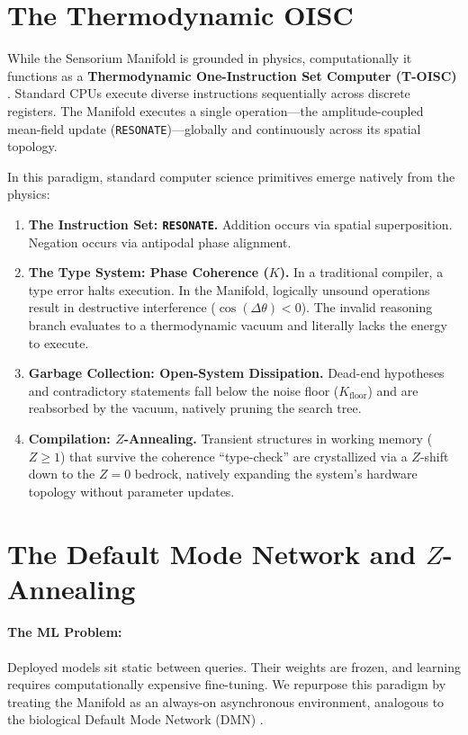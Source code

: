 \documentclass[11pt,a4paper]{article}
\begin{document}
\section{The Thermodynamic OISC}
\label{sec:thermodynamic_oisc}
\label{subsec:oisc}

While the Sensorium Manifold is grounded in physics, computationally it functions as a \textbf{Thermodynamic One-Instruction Set Computer (T-OISC)} \citep{mavaddat1988urisc}. Standard CPUs execute diverse instructions sequentially across discrete registers. The Manifold executes a single operation---the amplitude-coupled mean-field update (\texttt{RESONATE})---globally and continuously across its spatial topology. 

In this paradigm, standard computer science primitives emerge natively from the physics:
\begin{enumerate}[nosep]
  \item \textbf{The Instruction Set: \texttt{RESONATE}.} Addition occurs via spatial superposition. Negation occurs via antipodal phase alignment.
  \item \textbf{The Type System: Phase Coherence ($K$).} In a traditional compiler, a type error halts execution. In the Manifold, logically unsound operations result in destructive interference ($\cos(\Delta\theta) < 0$). The invalid reasoning branch evaluates to a thermodynamic vacuum and literally lacks the energy to execute.
  \item \textbf{Garbage Collection: Open-System Dissipation.} Dead-end hypotheses and contradictory statements fall below the noise floor ($K_{\mathrm{floor}}$) and are reabsorbed by the vacuum, natively pruning the search tree.
  \item \textbf{Compilation: $Z$-Annealing.} Transient structures in working memory ($Z \ge 1$) that survive the coherence ``type-check'' are crystallized via a $Z$-shift down to the $Z=0$ bedrock, natively expanding the system's hardware topology without parameter updates.
\end{enumerate}





\section{The Default Mode Network and $Z$-Annealing}
\label{sec:autonomous_dynamics}

\paragraph{The ML Problem:} 
Deployed models sit static between queries. Their weights are frozen, and learning requires computationally expensive fine-tuning. We repurpose this paradigm by treating the Manifold as an always-on asynchronous environment, analogous to the biological Default Mode Network (DMN) \citep{raichle2001default, buckner2008brain}.
\end{document}
